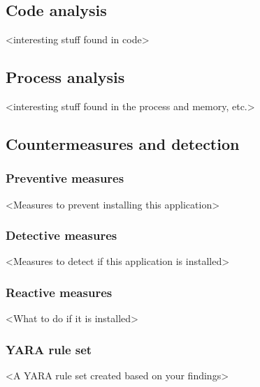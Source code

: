 \newpage
\subsection{Code analysis}

<interesting stuff found in code>

\newpage
\subsection{Process analysis}

<interesting stuff found in the process and memory, etc.>

\newpage
\subsection{Countermeasures and detection}

\subsubsection{Preventive measures}


<Measures to prevent installing this application>

\subsubsection{Detective measures}

<Measures to detect if this application is installed>

\subsubsection{Reactive measures}

<What to do if it is installed>

\subsubsection{YARA rule set}

<A YARA rule set created based on your findings>
